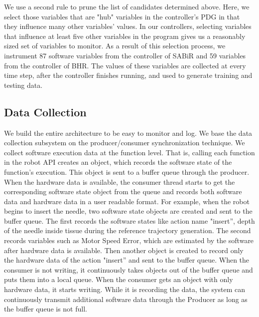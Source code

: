 We use a second rule to prune the list of candidates determined above. Here, we select those variables that are "hub" variables in the controller’s PDG in that they influence many other variables' values. In our controllers, selecting variables that influence at least five other variables in the program gives us a reasonably sized set of variables to monitor. As a result of this selection process, we instrument 87 software variables from the controller of SABiR and 59 variables from the controller of BHR. The values of these variables are collected at every time step, after the controller finishes running, and used to generate training and testing data.

\subsection{Data Collection}\label{subsec:datacollection}
We build the entire architecture to be easy to monitor and log. We base the data collection subsystem on the producer/consumer synchronization technique. We collect software execution data at the function level. That is, calling each function in the robot API creates an object, which records the software state of the function’s execution. This object is sent to a buffer queue through the producer. When the hardware data is available, the consumer thread starts to get the corresponding software state object from the queue and records both software data and hardware data in a user readable format. For example, when the robot begins to insert the needle, two software state objects are created and sent to the buffer queue. The first records the software states like action name "insert'', depth of the needle inside tissue during the reference trajectory generation. The second records variables such as Motor Speed Error, which are estimated by the software after hardware data is available. Then another object is created to record only the hardware data of the action "insert'' and sent to the buffer queue. When the consumer is not writing, it continuously takes objects out of the buffer queue and puts them into a local queue. When the consumer gets an object with only hardware data, it starts writing. While it is recording the data, the system can continuously transmit additional software data through the Producer as long as the buffer queue is not full.

